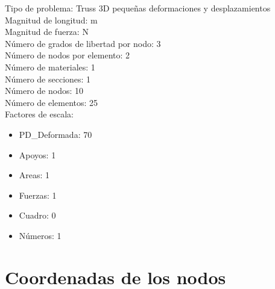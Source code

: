 \documentclass[a4paper,11pt]{article}
\begin{document}
Tipo de problema: Truss 3D pequeñas deformaciones y desplazamientos\\ 

Magnitud de longitud: m \\

Magnitud de fuerza: N \\

Número de grados de libertad por nodo: 3 \\

Número de nodos por elemento: 2 \\

Número de materiales: 1 \\

Número de secciones: 1 \\

Número de nodos: 10 \\

Número de elementos: 25 \\

Factores de escala: 
\begin{itemize} 
\item  PD\_Deformada: 70 
\item  Apoyos: 1 
\item  Areas: 1 
\item  Fuerzas: 1 
\item  Cuadro: 0 
\item  Números: 1 
\end{itemize} 
\newpage       

\section{Coordenadas de los nodos} 
\end{document}
